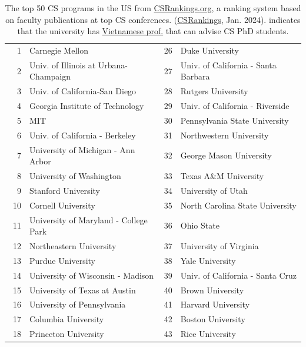 \documentclass[oneside,11pt,dvipsnames]{book}
\newcommand{\red}[1]{{\color{red}{#1}}}
\begin{document}
\begin{table}
  \centering
  \small
  \caption{The top 50 CS programs in the US from \href{https://www.csrankings.org}{CSRankings.org}, a ranking system  based on faculty publications at top CS conferences. (\href{https://csrankings.org}{CSRankings}, Jan. 2024). \red{$^*$} indicates that the university has \href{https://github.com/dynaroars/dynaroars.github.io/wiki/Viet-CS-Profs-US}{Vietnamese prof.} that can advise CS PhD students.}\label{tab:ranking}
  \begin{tabular}{rl|rl}
    \toprule
    1 & Carnegie Mellon & 26 & Duke University \\
    2 & Univ. of Illinois at Urbana-Champaign\red{$^*$}  & 27 & Univ. of California - Santa Barbara \\
    3 & Univ. of California-San Diego & 28 & Rutgers University\red{$^*$} \\
    4 & Georgia Institute of Technology & 29 & Univ. of California - Riverside\\
    5 & MIT                            & 30 & Pennsylvania State University  \\
    6 & Univ. of California - Berkeley& 31 & Northwestern University\\
    7 & University of Michigan - Ann Arbor\red{$^*$}   & 32& George Mason University\red{$^*$}\\
    8 & University of Washington      &33 &  Texas A\&M University\red{$^*$} \\
    9 &  Stanford University  &34&  University of Utah \\
    10 & Cornell University  & 35 &  North Carolina State University\\\
    11 & University of Maryland - College Park &  36& Ohio State \\
    12 & Northeastern University\red{$^*$} &37& University of Virginia  \\
    13 & Purdue University &38& Yale University \\
    14 & University of Wisconsin - Madison\red{$^*$} &39 & Univ. of California - Santa Cruz \\
    15 & University of Texas at Austin &40& Brown University \\
    16 & University of Pennsylvania &41 & Harvard University \\
    17 & Columbia University\red{$^*$} &42 & Boston University  \\
    18 & Princeton University\red{$^*$}  & 43& Rice University\\

\end{tabular}
\end{table}
\end{document}
